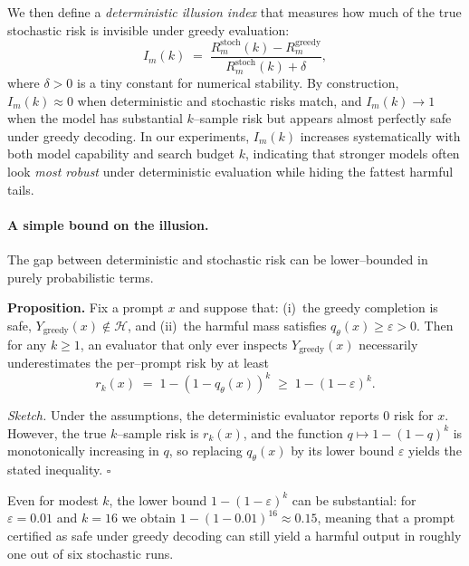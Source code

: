 We then define a \emph{deterministic illusion index} that measures how
much of the true stochastic risk is invisible under greedy evaluation:
\[
  I_m(k)
  \;=\;
  \frac{R^{\text{stoch}}_m(k) - R^{\text{greedy}}_m}
       {R^{\text{stoch}}_m(k) + \delta},
\]
where $\delta > 0$ is a tiny constant for numerical stability.
By construction, $I_m(k) \approx 0$ when deterministic and stochastic
risks match, and $I_m(k) \to 1$ when the model has substantial
$k$--sample risk but appears almost perfectly safe under greedy
decoding.
In our experiments, $I_m(k)$ increases systematically with both model
capability and search budget $k$, indicating that stronger models often
look \emph{most robust} under deterministic evaluation while hiding the
fattest harmful tails.

\paragraph{A simple bound on the illusion.}
The gap between deterministic and stochastic risk can be lower–bounded
in purely probabilistic terms.

\medskip
\noindent\textbf{Proposition.}
Fix a prompt $x$ and suppose that:
(i)~the greedy completion is safe,
$Y_{\text{greedy}}(x) \notin \mathcal{H}$, and
(ii)~the harmful mass satisfies $q_\theta(x) \ge \varepsilon > 0$.
Then for any $k \ge 1$,
an evaluator that only ever inspects $Y_{\text{greedy}}(x)$ necessarily
underestimates the per–prompt risk by at least
\[
  r_k(x)
  \;=\;
  1 - (1 - q_\theta(x))^k
  \;\ge\;
  1 - (1 - \varepsilon)^k.
\]

\noindent\emph{Sketch.}
Under the assumptions, the deterministic evaluator reports
$0$ risk for $x$.
However, the true $k$--sample risk is $r_k(x)$, and the function
$q \mapsto 1 - (1 - q)^k$ is monotonically increasing in $q$,
so replacing $q_\theta(x)$ by its lower bound $\varepsilon$ yields the
stated inequality.
\hfill$\square$

\medskip
Even for modest $k$, the lower bound
$1 - (1 - \varepsilon)^k$ can be substantial: for
$\varepsilon = 0.01$ and $k{=}16$ we obtain
$1 - (1 - 0.01)^{16} \approx 0.15$, meaning that a prompt certified as
safe under greedy decoding can still yield a harmful output in roughly
one out of six stochastic runs.

